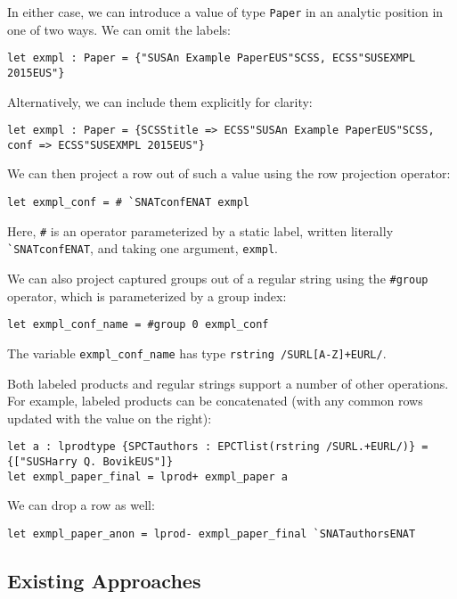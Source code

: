 In either case, we can introduce a value of type \lstinline{Paper} in an analytic position in one of two ways. We can omit the labels:
\begin{lstlisting}[numbers=none]
let exmpl : Paper = {"SUSAn Example PaperEUS"SCSS, ECSS"SUSEXMPL 2015EUS"}
\end{lstlisting}
Alternatively, we can include them explicitly for clarity:
\begin{lstlisting}[numbers=none]
let exmpl : Paper = {SCSStitle => ECSS"SUSAn Example PaperEUS"SCSS, conf => ECSS"SUSEXMPL 2015EUS"}
\end{lstlisting}

We can then project a row out of such a value using the row projection operator:
\begin{lstlisting}[numbers=none]
let exmpl_conf = # `SNATconfENAT exmpl 
\end{lstlisting}
Here, \lstinline{#} is an operator parameterized by a static label, written literally \lstinline{`SNATconfENAT}, and taking one argument, \lstinline{exmpl}. 

We can also project captured groups out of a regular string using the \lstinline{#group} operator, which is parameterized by a group index:
\begin{lstlisting}[numbers=none]
let exmpl_conf_name = #group 0 exmpl_conf
\end{lstlisting}

The variable \lstinline{exmpl_conf_name} has type \lstinline{rstring /SURL[A-Z]+EURL/}.

Both labeled products and regular strings support a number of other operations. For example, labeled products can be concatenated (with any common rows updated with the value on the right):
\begin{lstlisting}[numbers=none]
let a : lprodtype {SPCTauthors : EPCTlist(rstring /SURL.+EURL/)} = {["SUSHarry Q. BovikEUS"]}
let exmpl_paper_final = lprod+ exmpl_paper a
\end{lstlisting}
We can drop a row as well:
\begin{lstlisting}[numbers=none]
let exmpl_paper_anon = lprod- exmpl_paper_final `SNATauthorsENAT
\end{lstlisting}

\subsection{Existing Approaches}\label{sec:metamodules-related}
